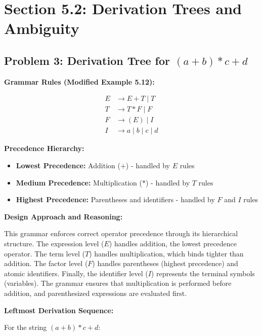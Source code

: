\documentclass[12pt]{article}
\begin{document}
\section{Section 5.2: Derivation Trees and Ambiguity}

\subsection{Problem 3: Derivation Tree for $(a+b)*c+d$}

\textbf{Grammar Rules (Modified Example 5.12):}

$$\begin{aligned}
E &\rightarrow E+T \mid T \\
T &\rightarrow T*F \mid F \\
F &\rightarrow (E) \mid I \\
I &\rightarrow a \mid b \mid c \mid d
\end{aligned}$$

\textbf{Precedence Hierarchy:}
\begin{itemize}
\item \textbf{Lowest Precedence:} Addition ($+$) - handled by $E$ rules
\item \textbf{Medium Precedence:} Multiplication ($*$) - handled by $T$ rules
\item \textbf{Highest Precedence:} Parentheses and identifiers - handled by $F$ and $I$ rules
\end{itemize}

\textbf{Design Approach and Reasoning:}

This grammar enforces correct operator precedence through its hierarchical structure. The expression level ($E$) handles addition, the lowest precedence operator. The term level ($T$) handles multiplication, which binds tighter than addition. The factor level ($F$) handles parentheses (highest precedence) and atomic identifiers. Finally, the identifier level ($I$) represents the terminal symbols (variables). The grammar ensures that multiplication is performed before addition, and parenthesized expressions are evaluated first.

\textbf{Leftmost Derivation Sequence:}

For the string $(a+b)*c+d$:
\end{document}
